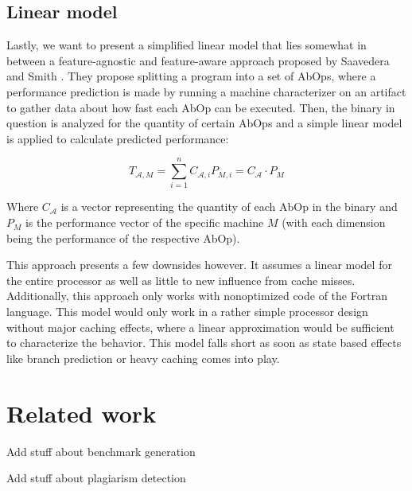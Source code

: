 \documentclass[../bachelor_paper.tex]{subfiles}
\begin{document}
\subsection{Linear model}
Lastly, we want to present a simplified linear model that lies somewhat in between a feature-agnostic and feature-aware approach proposed by Saavedera and Smith \cite{saavedraAnalysisBenchmarkCharacteristics1996}. They propose splitting a program into a set of \acp{AbOp}, where a performance prediction is made by running a machine characterizer on an artifact to gather data about how fast each \ac{AbOp} can be executed. Then, the binary in question is analyzed for the quantity of certain \acp{AbOp} and a simple linear model is applied to calculate predicted performance:

\begin{equation}
\label{eq:theo/simi/hybr/mode}
T_{\mathcal{A},M} = \sum^n_{i = 1}C_{\mathcal{A},i}P_{M,i} = C_\mathcal{A} \cdot P_M
\end{equation}

Where $C_{\mathcal{A}}$ is a vector representing the quantity of each \ac{AbOp} in the binary and $P_{M}$ is the performance vector of the specific machine $M$ (with each dimension being the performance of the respective \ac{AbOp}).

This approach presents a few downsides however. It assumes a linear model for the entire processor as well as little to new influence from cache misses. Additionally, this approach only works with nonoptimized code of the Fortran language. This model would only work in a rather simple processor design without major caching effects, where a linear approximation would be sufficient to characterize the behavior. This model falls short as soon as state based effects like branch prediction or heavy caching comes into play.

\section{Related work}
	\label{prob/rel}

Add stuff about benchmark generation

Add stuff about plagiarism detection
\end{document}
